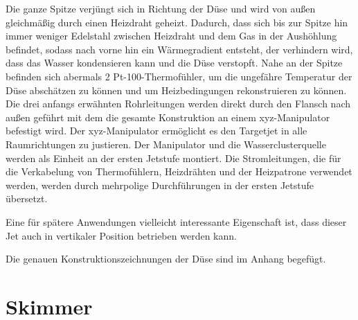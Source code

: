 Die ganze Spitze verjüngt sich in Richtung der Düse und wird von außen gleichmäßig durch einen Heizdraht geheizt. Dadurch, dass sich bis zur Spitze hin immer weniger Edelstahl zwischen Heizdraht und dem Gas in der Aushöhlung befindet, sodass nach vorne hin ein Wärmegradient entsteht, der verhindern wird, dass das Wasser kondensieren kann und die Düse verstopft. Nahe an der Spitze befinden sich abermals 2 Pt-100-Thermofühler, um die ungefähre Temperatur der Düse abschätzen zu können und um Heizbedingungen rekonstruieren zu können. 
%
Die drei anfangs erwähnten Rohrleitungen werden direkt durch den Flansch nach außen geführt mit dem die gesamte Konstruktion an einem xyz-Manipulator befestigt wird. Der xyz-Manipulator ermöglicht es den Targetjet in alle Raumrichtungen zu justieren. Der Manipulator und die Wasserclusterquelle werden als Einheit an der ersten Jetstufe montiert. 
Die Stromleitungen, die für die Verkabelung von Thermofühlern, Heizdrähten und der Heizpatrone verwendet werden, werden durch mehrpolige Durchführungen in der ersten Jetstufe übersetzt. 



Eine für spätere Anwendungen vielleicht interessante Eigenschaft ist, dass dieser Jet auch in vertikaler Position betrieben werden kann.

Die genauen Konstruktionszeichnungen der Düse sind im Anhang begefügt.
%
%



\section{Skimmer}


